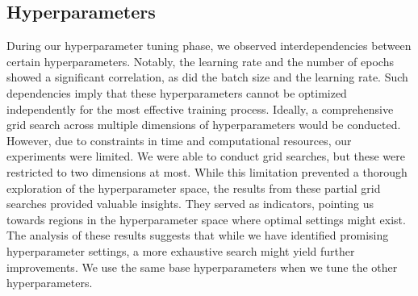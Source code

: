 \documentclass[twoside,11pt]{report}
\begin{document}
\subsection{Hyperparameters}
\label{sec:hyperparameters}

    During our hyperparameter tuning phase, we observed interdependencies between certain hyperparameters. Notably, 
    the learning rate and the number of epochs showed a significant correlation, as did the batch size and the learning 
    rate. Such dependencies imply that these hyperparameters cannot be optimized independently for the most effective 
    training process. Ideally, a comprehensive grid search across multiple dimensions of hyperparameters would be 
    conducted. However, due to constraints in time and computational resources, our experiments were limited.
    We were able to conduct grid searches, but these were restricted to two dimensions at most. While this limitation 
    prevented a thorough exploration of the hyperparameter space, the results from these partial grid searches provided 
    valuable insights. They served as indicators, pointing us towards regions in the hyperparameter space where optimal 
    settings might exist.
    The analysis of these results suggests that while we have identified promising hyperparameter settings, a more 
    exhaustive search might yield further improvements. 
    We use the same base hyperparameters when we tune the other hyperparameters.
\end{document}
